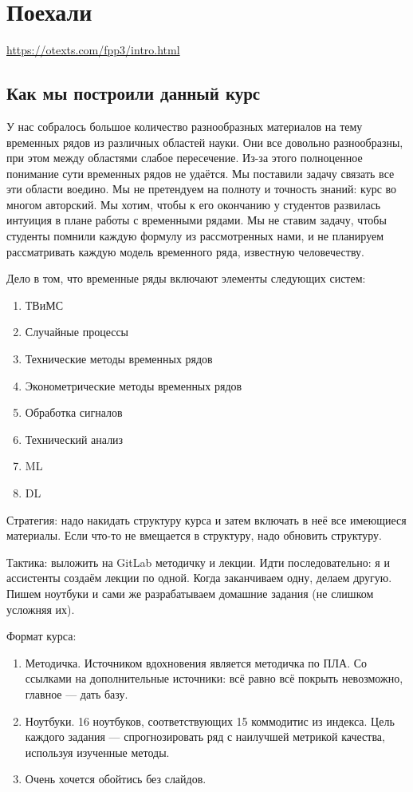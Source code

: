 \chapter{Поехали}
\url{https://otexts.com/fpp3/intro.html}

\section{Как мы построили данный курс}

У нас собралось большое количество разнообразных материалов на
тему
временных рядов из различных областей науки. Они все
довольно разнообразны, при этом между областями слабое пересечение.
Из-за этого полноценное понимание сути
временных рядов не удаётся. Мы поставили задачу
связать все эти области воедино. Мы не претендуем на полноту и
точность знаний: курс во многом авторский. Мы хотим, чтобы к  его
окончанию у студентов развилась интуиция в плане работы с временными
рядами. Мы не ставим задачу, чтобы студенты помнили каждую формулу из
рассмотренных нами, и не планируем рассматривать каждую модель
временного ряда, известную человечеству.

Дело в том, что временные ряды включают элементы следующих систем:
\begin{enumerate}
  \item ТВиМС
  \item Случайные процессы
  \item Технические методы временных рядов
  \item Эконометрические методы временных рядов
  \item Обработка сигналов
  \item Технический анализ
  \item ML
  \item DL
\end{enumerate}

Стратегия: надо накидать структуру курса и затем включать в неё все
имеющиеся материалы. Если что-то не вмещается в структуру, надо
обновить структуру.

Тактика: выложить на GitLab методичку и лекции. Идти последовательно:
я и ассистенты создаём лекции по одной. Когда заканчиваем одну,
делаем другую. Пишем ноутбуки и сами же разрабатываем домашние
задания (не слишком усложняя их).

Формат курса:
\begin{enumerate}
  \item Методичка. Источником вдохновения является методичка по ПЛА.
    Со ссылками на дополнительные источники: всё равно всё покрыть
    невозможно, главное — дать базу.
  \item Ноутбуки. 16 ноутбуков, соответствующих 15 коммодитис из
    индекса. Цель каждого задания — спрогнозировать ряд с наилучшей
    метрикой качества, используя изученные методы.
  \item Очень хочется обойтись без слайдов.
\end{enumerate}

